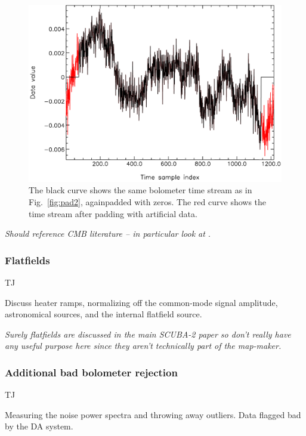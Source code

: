 \documentclass[useAMS,usenatbib,nofootinbib]{mn2e}
\begin{document}
\begin{itemize}
\begin{figure}
\centering
\includegraphics[width=\linewidth]{pad1.pdf}
\caption{The black curve shows the same bolometer time stream as in
Fig.~\ref{fig:pad2}, againpadded with zeros. The red curve shows the time stream
after padding with artificial data.}
\label{fig:pad1}
\end{figure}

\end{itemize}

\emph{Should reference CMB literature -- in particular look at
\citet{stompor2002}}.

\subsubsection{Flatfields}
\label{sec:flatfields}

TJ

Discuss heater ramps, normalizing off the common-mode signal
amplitude, astronomical sources, and the internal flatfield source.

\textit{Surely flatfields are discussed in the main SCUBA-2 paper so
don't really have any useful purpose here since they aren't
technically part of the map-maker.}

\subsubsection{Additional bad bolometer rejection}

TJ

Measuring the noise power spectra and throwing away outliers. Data
flagged bad by the DA system.
\end{document}
